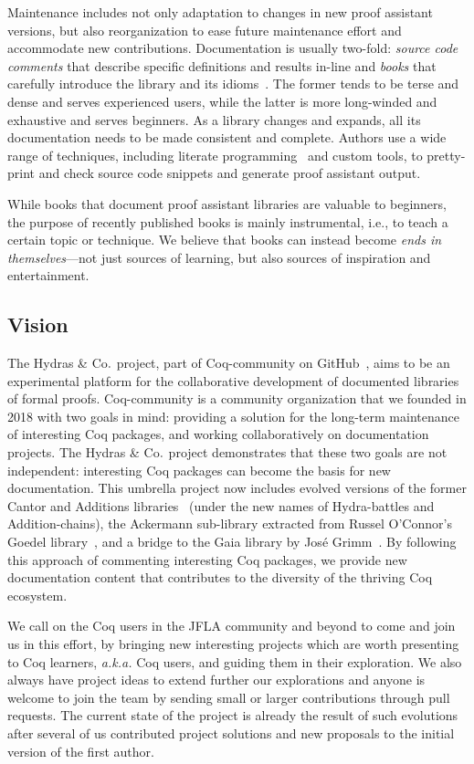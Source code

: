 \documentclass{easychair}
\newcommand{\coq}{Coq\xspace}
\newcommand{\community}{Coq-community\xspace}
\newcommand{\gaia}{Gaia\xspace}
\newcommand{\Hydras}{Hydras \& Co$\text.$\xspace}
\begin{document}
Maintenance includes not only adaptation to changes in new proof assistant versions, but also reorganization to ease future maintenance effort and accommodate new contributions. Documentation is usually two-fold: \emph{source code comments} that describe specific definitions and results in-line and \emph{books} that carefully introduce the library and its idioms~\cite{MCB,TheoremProvingLean4}. The former tends to be terse and dense and serves experienced users, while the latter is more long-winded and exhaustive and serves beginners. As a library changes and expands, all its documentation needs to be made consistent and complete. Authors use a wide range of techniques, including literate programming~\cite{Knuth1984} and custom tools, to pretty-print and check source code snippets and generate proof assistant output.

While books that document proof assistant libraries are valuable to beginners, the purpose of recently published books is mainly instrumental, i.e., to teach a certain topic or technique. We believe that books can instead become \emph{ends in themselves}---not just sources of learning, but also sources of inspiration and entertainment.

\subsection{Vision}
The \Hydras project, part of \community on GitHub~\cite{CoqCommunity}, aims to be an experimental platform for the collaborative development of documented libraries of formal proofs. \community is a community organization that we founded in 2018 with two goals in mind: providing a solution for the long-term maintenance of interesting \coq packages, and working collaboratively on documentation projects. The \Hydras project demonstrates that these two goals are not independent: interesting \coq packages can become the basis for new documentation.
%
This umbrella project now includes evolved versions of the former Cantor and Additions libraries~\cite{CantorContrib,AdditionsContrib} (under the new names of Hydra-battles and Addition-chains), the Ackermann sub-library extracted from Russel O'Connor's Goedel library~\cite{OConnor05, Goedel}, and a bridge to the \gaia library by José Grimm~\cite{Gaia,grimm:hal-00911710}.
%
By following this approach of commenting interesting \coq packages, we provide new documentation content that contributes to the diversity of the thriving \coq ecosystem.

We call on the \coq users in the JFLA community and beyond to come and join us in this effort, by bringing new interesting projects which are worth presenting to \coq learners, \emph{a.k.a.} \coq users, and guiding them in their exploration.
%
We also always have project ideas to extend further our explorations and anyone is welcome to join the team by sending small or larger contributions through pull requests.
%
The current state of the project is already the result of such evolutions after several of us contributed project solutions and new proposals to the initial version of the first author.
\end{document}
